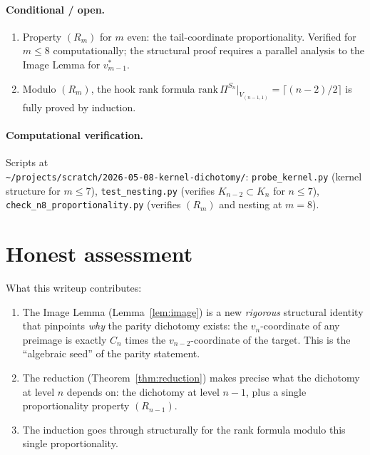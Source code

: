 \documentclass[11pt]{article}
\theoremstyle{definition}
\begin{document}
\paragraph{Conditional / open.}
\begin{enumerate}[topsep=0.3em,itemsep=0.2em,leftmargin=2em]
\item Property $(R_m)$ for $m$ even: the tail-coordinate
  proportionality. Verified for $m \le 8$ computationally; the
  structural proof requires a parallel analysis to the Image
  Lemma for $v_{m-1}^*$.
\item Modulo $(R_m)$, the hook rank formula
  $\mathrm{rank}\,\Pi^{S_n}|_{V_{(n-1,1)}} = \lceil(n-2)/2\rceil$ is
  fully proved by induction.
\end{enumerate}

\paragraph{Computational verification.}
Scripts at\\
\texttt{\textasciitilde/projects/scratch/2026-05-08-kernel-dichotomy/}:
\texttt{probe\_kernel.py} (kernel structure for $m \le 7$),
\texttt{test\_nesting.py} (verifies $K_{n-2} \subset K_n$ for
$n \le 7$), \texttt{check\_n8\_proportionality.py}
(verifies $(R_m)$ and nesting at $m=8$).

\section{Honest assessment}\label{sec:honest}

What this writeup contributes:

\begin{enumerate}[topsep=0.3em,itemsep=0.2em,leftmargin=2em]
\item The Image Lemma (Lemma~\ref{lem:image}) is a new \emph{rigorous}
  structural identity that pinpoints \emph{why} the parity dichotomy
  exists: the $v_n$-coordinate of any preimage is exactly
  $C_n$ times the $v_{n-2}$-coordinate of the target. This is the
  ``algebraic seed'' of the parity statement.
\item The reduction (Theorem~\ref{thm:reduction}) makes precise
  what the dichotomy at level $n$ depends on: the dichotomy at
  level $n-1$, plus a single proportionality property $(R_{n-1})$.
\item The induction goes through structurally for the rank formula
  modulo this single proportionality.
\end{enumerate}
\end{document}
